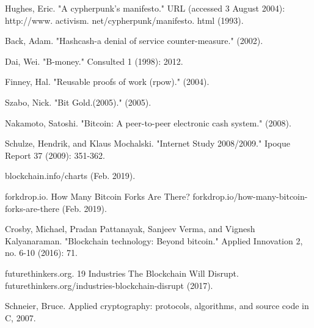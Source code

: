\documentclass[conference,compsoc]{IEEEtran}
\begin{document}
%
%
%
\begin{thebibliography}{1}

Hughes, Eric. "A cypherpunk’s manifesto." URL (accessed 3 August 2004): http://www. activism. net/cypherpunk/manifesto. html (1993).

Back, Adam. "Hashcash-a denial of service counter-measure." (2002).

Dai, Wei. "B-money." Consulted 1 (1998): 2012.

Finney, Hal. "Reusable proofs of work (rpow)." (2004).

Szabo, Nick. "Bit Gold.(2005)." (2005).

Nakamoto, Satoshi. "Bitcoin: A peer-to-peer electronic cash system." (2008).

Schulze, Hendrik, and Klaus Mochalski. "Internet Study 2008/2009." Ipoque Report 37 (2009): 351-362.

blockchain.info/charts (Feb. 2019).

forkdrop.io. How Many Bitcoin Forks Are There? forkdrop.io/how-many-bitcoin-forks-are-there (Feb. 2019).

Crosby, Michael, Pradan Pattanayak, Sanjeev Verma, and Vignesh Kalyanaraman. "Blockchain technology: Beyond bitcoin." Applied Innovation 2, no. 6-10 (2016): 71.

futurethinkers.org. 19 Industries The Blockchain Will Disrupt. futurethinkers.org/industries-blockchain-disrupt (2017).

Schneier, Bruce. Applied cryptography: protocols, algorithms, and source code in C, 2007.

\end{thebibliography}




\end{document}
